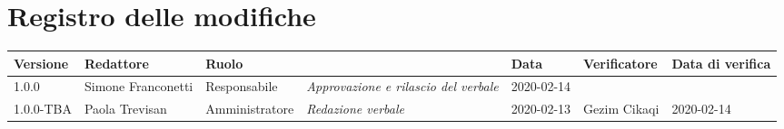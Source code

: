 \section*{Registro delle modifiche}
\renewcommand{\arraystretch}{1.8}

	\setlength\LTleft{-1.7cm}
	\begin{longtable}{|p{1.5cm}|p{1.7cm}|p{2cm}|p{2cm}|p{1.7cm}|p{2cm}|p{1.7cm}|}
		\hline

		\rowcolor{header}
		\textbf{Versione} & \textbf{Redattore} & \textbf{Ruolo} & \centering{\textbf{Descrizione}} & \textbf{Data}  & \textbf{Verificatore} & \textbf{Data di verifica}  \\

		\hline
		1.0.0 & Simone Franconetti & Responsabile & \small{\textit{Approvazione e rilascio del verbale}} & 2020-02-14 \\
		1.0.0-TBA & Paola Trevisan & Amministratore & \small{\textit{Redazione verbale}} & 2020-02-13 & Gezim Cikaqi &  2020-02-14 \\
		\hline
	\end{longtable}
	\setlength\LTleft{0cm}
